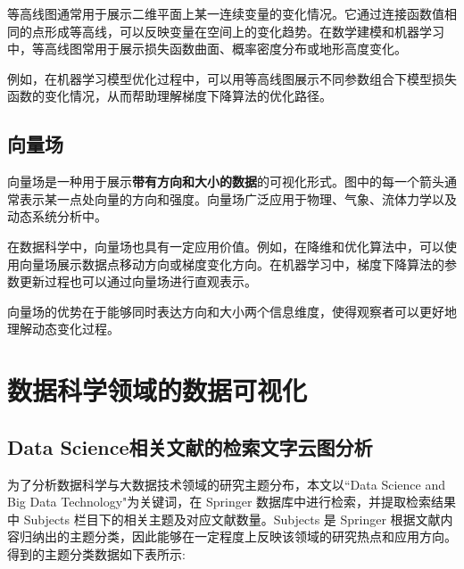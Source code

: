 \documentclass[UTF8,12pt]{ctexart}
\begin{document}
等高线图通常用于展示二维平面上某一连续变量的变化情况。它通过连接函数值相同的点形成等高线，可以反映变量在空间上的变化趋势。在数学建模和机器学习中，等高线图常用于展示损失函数曲面、概率密度分布或地形高度变化。

例如，在机器学习模型优化过程中，可以用等高线图展示不同参数组合下模型损失函数的变化情况，从而帮助理解梯度下降算法的优化路径。


\subsection{向量场}
向量场是一种用于展示\textbf{带有方向和大小的数据}的可视化形式。图中的每一个箭头通常表示某一点处向量的方向和强度。向量场广泛应用于物理、气象、流体力学以及动态系统分析中。

在数据科学中，向量场也具有一定应用价值。例如，在降维和优化算法中，可以使用向量场展示数据点移动方向或梯度变化方向。在机器学习中，梯度下降算法的参数更新过程也可以通过向量场进行直观表示。

向量场的优势在于能够同时表达方向和大小两个信息维度，使得观察者可以更好地理解动态变化过程。


\section{数据科学领域的数据可视化}

\subsection{Data Science相关文献的检索文字云图分析}
为了分析数据科学与大数据技术领域的研究主题分布，本文以``Data Science and Big Data Technology"为关键词，在 Springer 数据库中进行检索，并提取检索结果中 Subjects 栏目下的相关主题及对应文献数量。Subjects 是 Springer 根据文献内容归纳出的主题分类，因此能够在一定程度上反映该领域的研究热点和应用方向。得到的主题分类数据如下表所示:
\end{document}
